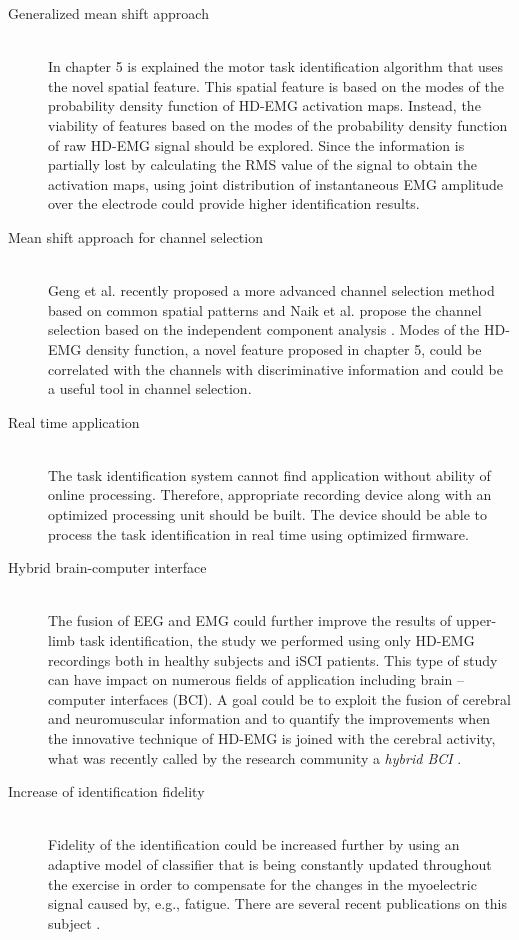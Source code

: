 \begin{description}
\item[Generalized mean shift approach] \hfill \\
	In chapter 5 is explained the motor task identification algorithm that uses the novel spatial feature. This spatial feature is based on the modes of the probability density function of HD-EMG activation maps. Instead, the viability of features based on the  modes of the probability density function of raw HD-EMG signal should be explored. Since the information is partially lost by calculating the RMS value of the signal to obtain the activation maps, using joint distribution of instantaneous EMG amplitude over the electrode could provide higher identification results.
	
\item[Mean shift approach for channel selection] \hfill \\
	Geng et al. recently proposed a more advanced channel selection method based on common spatial patterns \citep{Geng2014} and Naik et al. propose the channel selection based on the independent component analysis \citep{Naik2016}. Modes of the HD-EMG density function, a novel feature proposed in chapter 5, could be correlated with the channels with discriminative information and could be a useful tool in channel selection.

\item[Real time application] \hfill \\
	The task identification system cannot find application without ability of online processing. Therefore, appropriate recording device along with an optimized processing unit should be built. The device should be able to process the task identification in real time using optimized firmware.

\item[Hybrid brain-computer interface] \hfill \\
	The fusion of EEG and EMG could further improve the results of upper-limb task identification, the study we performed using only HD-EMG recordings both in healthy subjects and iSCI patients. This type of study can have impact on numerous fields of application including brain – computer interfaces (BCI). A goal could be to exploit the fusion of cerebral and neuromuscular information and to quantify the improvements when the innovative technique of HD-EMG is joined with the cerebral activity, what was recently called by the research community a \emph{hybrid BCI} \citep{Muller-Putz2015, Rohm2013}.

\item [Increase of identification fidelity] \hfill \\
	Fidelity of the identification could be increased further by using an adaptive model of classifier that is being constantly updated throughout the exercise in order to compensate for the changes in the myoelectric signal caused by, e.g., fatigue. There are several recent publications on this subject \citep{Hahne2015, Vidovic2016, Sensinger2009}.


\end{description}
